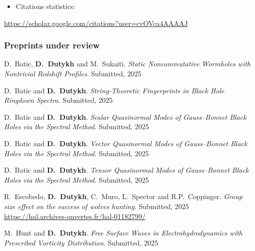\documentclass[final, a4paper, oneside, 12pt]{article}
\numberwithin{equation}{section}
\begin{document}
\begin{itemize}
  \item Citations statistics:
\end{itemize}

\begin{center}
  \url{https://scholar.google.com/citations?user=cvOVca4AAAAJ}
\end{center}

\subsubsection{Preprints under review}

\begin{etaremune}

  \item D.~Batic, \textbf{D.~Dutykh} and M.~Sukaiti. \textit{Static Noncommutative Wormholes with Nontrivial Redshift Profiles}. Submitted, 2025 %

  \item D.~Batic and \textbf{D.~Dutykh}. \textit{String-Theoretic Fingerprints in Black Hole Ringdown Spectra}. Submitted, 2025 %

  \item D.~Batic and \textbf{D.~Dutykh}. \textit{Scalar Quasinormal Modes of Gauss--Bonnet Black Holes via the Spectral Method}. Submitted, 2025 %

  \item D.~Batic and \textbf{D.~Dutykh}. \textit{Vector Quasinormal Modes of Gauss--Bonnet Black Holes via the Spectral Method}. Submitted, 2025 %
  
  \item D.~Batic and \textbf{D.~Dutykh}. \textit{Tensor Quasinormal Modes of Gauss--Bonnet Black Holes via the Spectral Method}. Submitted, 2025 %

  \item R.~Escobedo, \textbf{D.~Dutykh}, C.~Muro, L.~Spector and R.P.~Coppinger. \textit{Group size effect on the success of wolves hunting}. Submitted, 2025 \\ %
  \url{https://hal.archives-ouvertes.fr/hal-01182799/}

  \item M.~Hunt and \textbf{D.~Dutykh}. \textit{Free Surface Waves in Electrohydrodynamics with Prescribed Vorticity Distribution}. Submitted, 2025 %


\end{etaremune}
\end{document}
